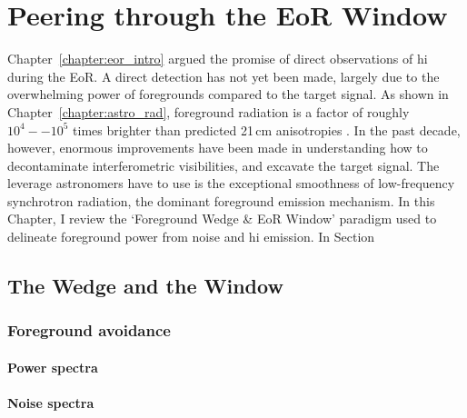 \chapter{Peering through the EoR Window}
\label{chapter:eor_window_theory}

Chapter~\ref{chapter:eor_intro} argued the promise of direct observations of {\sc hi} during the EoR. A direct detection has not yet been made, largely due to the overwhelming power of foregrounds compared to the target signal. As shown in Chapter~\ref{chapter:astro_rad}, foreground radiation is a factor of roughly $10^4 -- 10^5$ times brighter than predicted 21\,cm anisotropies .  In the past decade, however, enormous improvements have been made in understanding how to decontaminate interferometric visibilities, and excavate the target signal. The leverage astronomers have to use is the exceptional smoothness of low-frequency synchrotron radiation, the dominant foreground emission mechanism. In this Chapter, I review the `Foreground Wedge \& EoR Window' paradigm used to delineate foreground power from noise and {\sc hi} emission. In Section

\section{The Wedge and the Window}  %
\label{sec:wedge_and_window}







\subsection{Foreground avoidance}
\subsubsection{Power spectra}
\subsubsection{Noise spectra}

